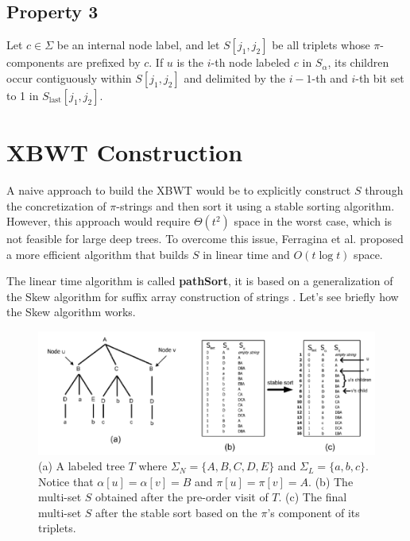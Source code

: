\subsection{Property 3} \label{prop3}
Let $c \in \Sigma$ be an internal node label, and let $S[j_1, j_2]$ be all triplets whose $\pi$-components are prefixed by $c$. If $u$ is the $i$-th node labeled $c$ in $S_{\alpha}$, its children occur contiguously within $S[j_1, j_2]$ and delimited by the $i - 1$-th and $i$-th bit set to 1 in $S_{\text{last}}[j_1, j_2]$.

\section{XBWT Construction}
A naive approach to build the XBWT would be to explicitly construct $S$ through the concretization of $\pi$-strings and then sort it using a stable sorting algorithm. However, this approach would require $\Theta(t^2)$ space in the worst case, which is not feasible for large deep trees. To overcome this issue, Ferragina et al. \cite{ferragina2009compressing} proposed a more efficient algorithm that builds $S$ in linear time and $O(t \log t)$ space.

The linear time algorithm is called \textbf{pathSort}, it is based on a generalization of the Skew algorithm for suffix array construction of strings \cite{karkkainen2006linear}. Let's see briefly how the Skew algorithm works.

\begin{figure}
    \centering
    \includegraphics[width=1\textwidth]{Immagini/XBWT_example.png}
    \caption[XBWT example]{(a) A labeled tree $T$ where $\Sigma_N = \{A, B, C, D, E\}$ and $\Sigma_L = \{a, b, c\}$. Notice that $\alpha[u] = \alpha[v] = B$ and $\pi[u] = \pi[v] = A$. (b) The multi-set $S$ obtained after the pre-order visit of $T$. (c) The final multi-set $S$ after the stable sort based on the $\pi$'s component of its triplets.}
    \label{fig:XBWT_example}
\end{figure}

